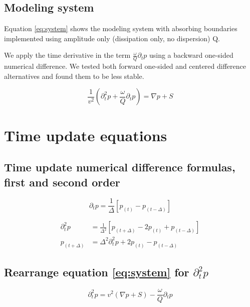 \documentclass[10pt,fleqn]{article}
\begin{document}
\newpage
\subsection{Modeling system}
Equation \ref{eq:system} shows the modeling system with absorbing boundaries implemented 
using amplitude only (dissipation only, no dispersion) Q. \vspace{10pt}

We apply the time derivative in the term $\displaystyle \frac{\omega}{Q} \partial_t p$ 
using a backward one-sided numerical difference. We tested both forward one-sided and 
centered difference alternatives and found them to be less stable.

\begin{equation}
	\frac{1}{v^2} \left( \partial_t^2 p + \frac{\omega}{Q} \partial_t p \right) = \nabla p + S
	\label{eq:system}
\end{equation}

\section{Time update equations}

\subsection{Time update numerical difference formulas, first and second order}
\begin{equation}
	\partial_t p = \frac{1}{\Delta} \left[ p_{(t)} - p_{(t - \Delta)} \right]
	\label{eq:diff1}
\end{equation}

\begin{equation}
	\begin{aligned}
		\partial_t^2 p & = \frac{1}{\Delta^2} \left[ p_{(t+\Delta)} - 2 p_{(t)} + p_{(t - \Delta)} \right] \\[10pt]
		p_{(t+\Delta)} & = \Delta^2 \partial_t^2 p + 2 p_{(t)} - p_{(t - \Delta)}
	\end{aligned}
	\label{eq:diff2}
\end{equation}

\subsection{Rearrange equation \ref{eq:system} for $\partial_t^2 p$}
\begin{equation}
	\partial_t^2 p = v^2 \left( \nabla p + S \right) - \frac{\omega}{Q} \partial_t p
\end{equation}
\end{document}
